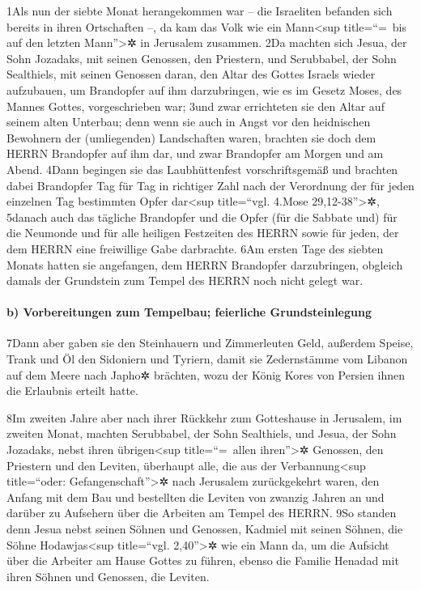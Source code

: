 1Als nun der siebte Monat herangekommen war -- die Israeliten befanden
sich bereits in ihren Ortschaften --, da kam das Volk wie ein
Mann\textless sup title=``=~bis auf den letzten Mann''\textgreater✲ in
Jerusalem zusammen. 2Da machten sich Jesua, der Sohn Jozadaks, mit
seinen Genossen, den Priestern, und Serubbabel, der Sohn Sealthiels, mit
seinen Genossen daran, den Altar des Gottes Israels wieder aufzubauen,
um Brandopfer auf ihm darzubringen, wie es im Gesetz Moses, des Mannes
Gottes, vorgeschrieben war; 3und zwar errichteten sie den Altar auf
seinem alten Unterbau; denn wenn sie auch in Angst vor den heidnischen
Bewohnern der (umliegenden) Landschaften waren, brachten sie doch dem
HERRN Brandopfer auf ihm dar, und zwar Brandopfer am Morgen und am
Abend. 4Dann begingen sie das Laubhüttenfest vorschriftsgemäß und
brachten dabei Brandopfer Tag für Tag in richtiger Zahl nach der
Verordnung der für jeden einzelnen Tag bestimmten Opfer dar\textless sup
title=``vgl. 4.Mose 29,12-38''\textgreater✲, 5danach auch das tägliche
Brandopfer und die Opfer (für die Sabbate und) für die Neumonde und für
alle heiligen Festzeiten des HERRN sowie für jeden, der dem HERRN eine
freiwillige Gabe darbrachte. 6Am ersten Tage des siebten Monats hatten
sie angefangen, dem HERRN Brandopfer darzubringen, obgleich damals der
Grundstein zum Tempel des HERRN noch nicht gelegt war.

\hypertarget{b-vorbereitungen-zum-tempelbau-feierliche-grundsteinlegung}{%
\paragraph{b) Vorbereitungen zum Tempelbau; feierliche
Grundsteinlegung}\label{b-vorbereitungen-zum-tempelbau-feierliche-grundsteinlegung}}

7Dann aber gaben sie den Steinhauern und Zimmerleuten Geld, außerdem
Speise, Trank und Öl den Sidoniern und Tyriern, damit sie Zedernstämme
vom Libanon auf dem Meere nach Japho✲ brächten, wozu der König Kores von
Persien ihnen die Erlaubnis erteilt hatte.

8Im zweiten Jahre aber nach ihrer Rückkehr zum Gotteshause in Jerusalem,
im zweiten Monat, machten Serubbabel, der Sohn Sealthiels, und Jesua,
der Sohn Jozadaks, nebst ihren übrigen\textless sup title=``=~allen
ihren''\textgreater✲ Genossen, den Priestern und den Leviten, überhaupt
alle, die aus der Verbannung\textless sup title=``oder:
Gefangenschaft''\textgreater✲ nach Jerusalem zurückgekehrt waren, den
Anfang mit dem Bau und bestellten die Leviten von zwanzig Jahren an und
darüber zu Aufsehern über die Arbeiten am Tempel des HERRN. 9So standen
denn Jesua nebst seinen Söhnen und Genossen, Kadmiel mit seinen Söhnen,
die Söhne Hodawjas\textless sup title=``vgl. 2,40''\textgreater✲ wie ein
Mann da, um die Aufsicht über die Arbeiter am Hause Gottes zu führen,
ebenso die Familie Henadad mit ihren Söhnen und Genossen, die Leviten.

